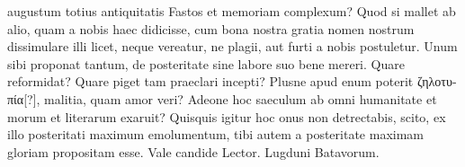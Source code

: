 augustum totius antiquitatis Fastos et memoriam complexum?
Quod si mallet ab alio, quam a nobis haec didicisse, cum bona nostra
gratia nomen nostrum dissimulare illi licet, neque vereatur, ne
plagii, aut furti a nobis postuletur.
Unum sibi proponat tantum, de
posteritate sine labore suo bene mereri.
Quare reformidat?
Quare piget tam praeclari incepti?
Plusne apud enum poterit \textgreek{ζηλοτυπία[?]}, malitia,
quam amor veri?
Adeone hoc saeculum ab omni humanitate et
morum et literarum exaruit?
Quisquis igitur hoc onus non detrectabis,
scito, ex illo posteritati maximum emolumentum, tibi autem
a posteritate maximam gloriam propositam esse.
Vale candide
Lector.
Lugduni Batavorum.
%
